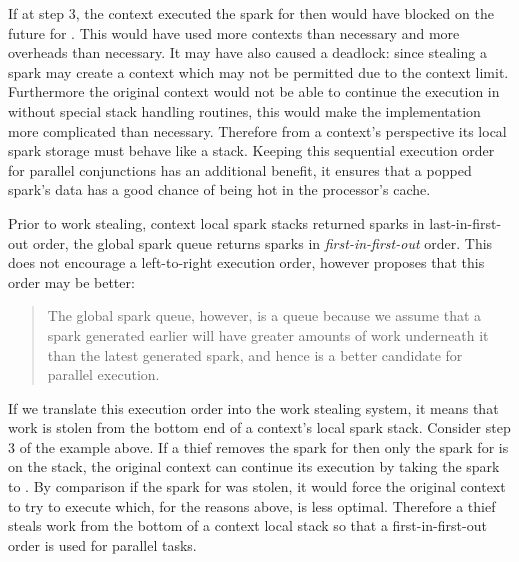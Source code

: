If at step 3,
the context executed the spark for  then
 would have blocked on the future for .
This would have used more contexts than necessary and more overheads than
necessary.
It may have also caused a deadlock:
since stealing a spark may create a context which may not be permitted due
to the context limit.
Furthermore
the original context would not be able to continue the execution in 
without special stack handling routines,
this would make the implementation more complicated than necessary.
Therefore from a context's perspective its local spark storage must behave
like a stack.
Keeping this sequential execution order for parallel conjunctions has
an additional benefit,
it ensures that a popped spark's data has a good chance of being hot in the
processor's cache.

Prior to work stealing,
context local spark stacks returned sparks in last-in-first-out
order,
the global spark queue returns sparks in \emph{first-in-first-out} order.
This does not encourage a left-to-right execution order,
however \citet{wang:2006:hons} proposes that this order may be better:

\begin{quote}
The global spark queue, however, is a queue because we assume that a
spark generated earlier will have greater amounts of work underneath it
than the latest generated spark, and hence is a better candidate for
parallel execution.
\end{quote}

\noindent
If we translate this execution order into the work stealing system,
it means that work is stolen from the bottom end of a context's local spark
stack.
Consider step 3 of the example above.
If a thief removes the spark for 
then only the spark for  is on the stack,
the original context can continue its execution by taking the spark to
.
By comparison if the spark for  was stolen,
it would force the original context to try to execute 
which, for the reasons above, is less optimal.
Therefore a thief steals work from the bottom of a context local stack
so that a first-in-first-out order is used for parallel tasks.

